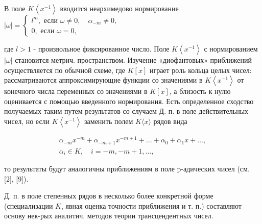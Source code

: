 \documentclass[10pt]{article}
\begin{document}
В поле $K\left\langle x^{-1}\right\rangle$ вводится неархимедово нормирование $|\omega|=\left\{\begin{array}{l}l^{m}, \text { если } \omega \neq 0, \quad \alpha_{-m} \neq 0, \\ 0, \text { если } \omega=0,\end{array}\right.$



где $l>1$ - произвольное фиксированное число. Поле $K\left\langle x^{-1}\right\rangle$ с нормированием $|\omega|$ становится метрич. пространством. Изучение «диофантовых» приближений осуществляется по обычной схеме, где $K[x]$ играет роль кольца целых чисел: рассматриваются аппроксимирующие функции со значениями в $K\left\langle x^{-1}\right\rangle$ от конечного числа переменных со значениями в $K[x]$, а близость к нулю оценивается с помощью введенного нормирования. Есть определенное сходство получаемых таким путем результатов со случаем Д. п. в поле действительных чисел, но если $K\left\langle x^{-1}\right\rangle$ заменить полем $K\langle x\rangle$ рядов вида



\[

\begin{gathered}

\alpha_{-m} x^{-m}+\alpha_{-m+1} x^{-m+1}+\ldots+\alpha_{0}+\alpha_{1} x+\ldots, \\

\alpha_{i} \in K, \quad i=-m,-m+1, \ldots,

\end{gathered}

\]



то результаты будут аналогичны приближениям в поле p-адических чисел (см. [2], [9]).



Д. п. в поле степенных рядов в несколько более конкретной форме (специализации $K$, явная оценка точности приближения и т. п.) составляют основу нек-рых аналитич. методов теории трансцендентных чисел.
\end{document}

